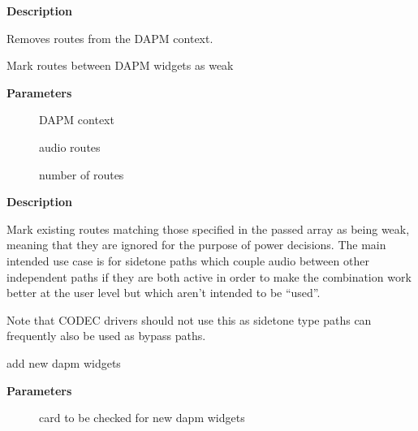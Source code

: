 \documentclass[a4paper,8pt,english]{sphinxmanual}
\begin{document}
\textbf{Description}

Removes routes from the DAPM context.

\begin{fulllineitems}
\label{sound/kernel-api/alsa-driver-api:c.snd_soc_dapm_weak_routes}
Mark routes between DAPM widgets as weak

\end{fulllineitems}


\textbf{Parameters}
\begin{description}
\item[{}] \leavevmode
DAPM context

\item[{}] \leavevmode
audio routes

\item[{}] \leavevmode
number of routes

\end{description}

\textbf{Description}

Mark existing routes matching those specified in the passed array
as being weak, meaning that they are ignored for the purpose of
power decisions.  The main intended use case is for sidetone paths
which couple audio between other independent paths if they are both
active in order to make the combination work better at the user
level but which aren't intended to be ``used''.

Note that CODEC drivers should not use this as sidetone type paths
can frequently also be used as bypass paths.

\begin{fulllineitems}
\label{sound/kernel-api/alsa-driver-api:c.snd_soc_dapm_new_widgets}
add new dapm widgets

\end{fulllineitems}


\textbf{Parameters}
\begin{description}
\item[{}] \leavevmode
card to be checked for new dapm widgets

\end{description}
\end{document}
